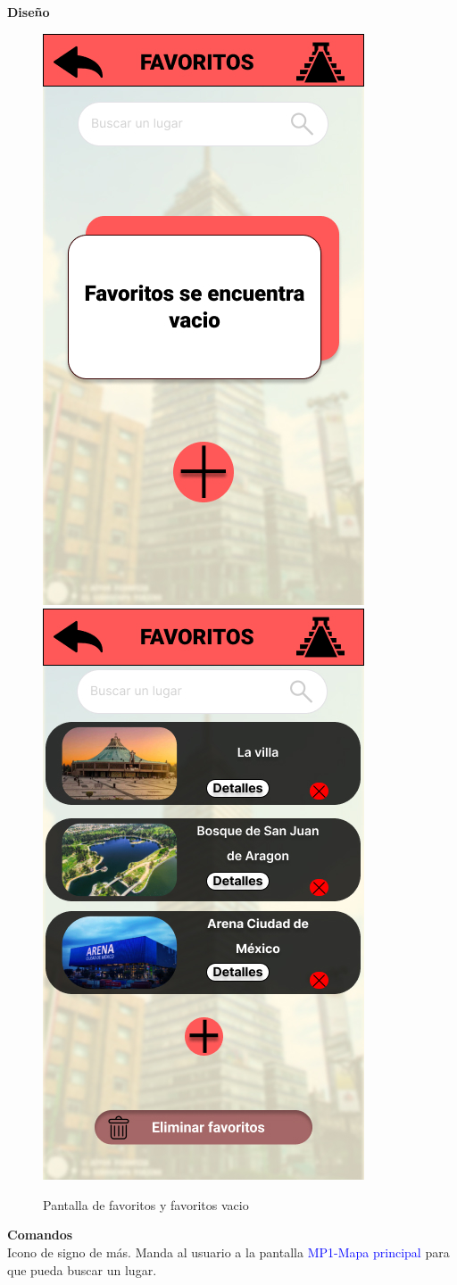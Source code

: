 \textbf{Diseño}
    \begin{figure}[h]
        
            \centering
            \includegraphics[width=.4\linewidth]{Pantallas Prototipo3/IU25 Pantalla Favoritos vacio.jpg}
            \includegraphics[width=.4\linewidth]{Pantallas Prototipo3/IU23 Pantalla Favoritos.jpg}
            \caption{Pantalla de favoritos y favoritos vacio}
    
    \end{figure}

\textbf{Comandos} \\
Icono de signo de más. Manda al usuario a la pantalla \textcolor{blue}{MP1-Mapa principal} para que pueda buscar un lugar.






